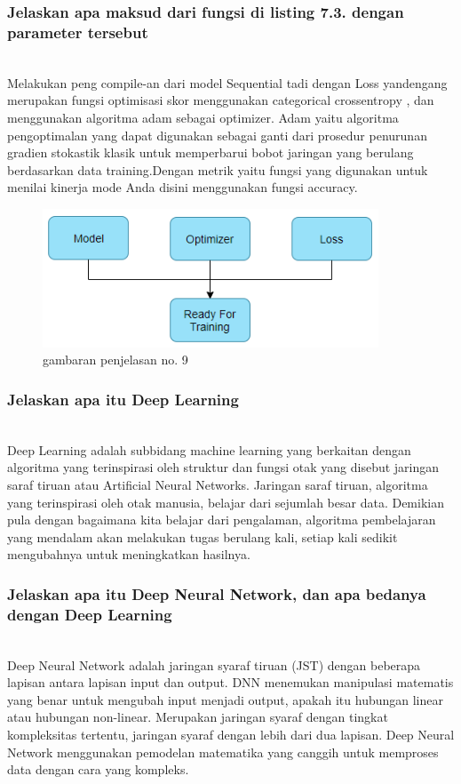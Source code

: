 \subsubsection{Jelaskan apa maksud dari fungsi di listing 7.3. dengan parameter tersebut}
\hfill\\

Melakukan peng compile-an dari model Sequential tadi dengan Loss yandengang merupakan fungsi optimisasi skor menggunakan categorical crossentropy , dan menggunakan algoritma adam sebagai optimizer. Adam yaitu algoritma pengoptimalan yang dapat digunakan sebagai ganti dari prosedur penurunan gradien stokastik klasik untuk memperbarui bobot jaringan yang berulang berdasarkan data training.Dengan metrik yaitu fungsi yang digunakan untuk menilai kinerja mode Anda disini menggunakan fungsi accuracy.
\begin{figure}[H]
	\centering
	\includegraphics[width=10cm]{figures/1174083/figures7/9.png}
	\caption{gambaran penjelasan no. 9}
\end{figure}

\subsubsection{Jelaskan apa itu Deep Learning}
\hfill\\
Deep Learning adalah subbidang machine learning yang berkaitan dengan algoritma yang terinspirasi oleh struktur dan fungsi otak yang disebut jaringan saraf tiruan atau Artificial Neural Networks. Jaringan saraf tiruan, algoritma yang terinspirasi oleh otak manusia, belajar dari sejumlah besar data. Demikian pula dengan bagaimana kita belajar dari pengalaman, algoritma pembelajaran yang mendalam akan melakukan tugas berulang kali, setiap kali sedikit mengubahnya untuk meningkatkan hasilnya.

\subsubsection{Jelaskan apa itu Deep Neural Network, dan apa bedanya dengan Deep Learning}
\hfill\\
Deep Neural Network adalah jaringan syaraf tiruan (JST) dengan beberapa lapisan antara lapisan input dan output. DNN menemukan manipulasi matematis yang benar untuk mengubah input menjadi output, apakah itu hubungan linear atau hubungan non-linear. Merupakan jaringan syaraf dengan tingkat kompleksitas tertentu, jaringan syaraf dengan lebih dari dua lapisan. Deep Neural Network menggunakan pemodelan matematika yang canggih untuk memproses data dengan cara yang kompleks.

